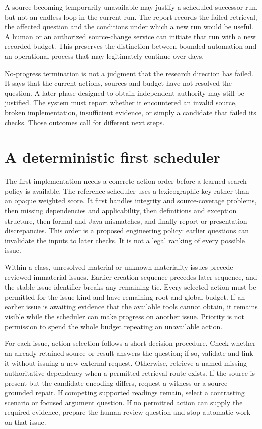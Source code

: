 \documentclass[12pt,a4paper,oneside,openany]{book}
\begin{document}
A source becoming temporarily unavailable may justify a scheduled successor run,
but not an endless loop in the current run. The report records the failed
retrieval, the affected question and the conditions under which a new run would
be useful. A human or an authorized source-change service can initiate that run
with a new recorded budget. This preserves the distinction between bounded
automation and an operational process that may legitimately continue over days.

No-progress termination is not a judgment that the research direction has failed.
It says that the current actions, sources and budget have not resolved the
question. A later phase designed to obtain independent authority may still be
justified. The system must report whether it encountered an invalid source,
broken implementation, insufficient evidence, or simply a candidate that failed
its checks. Those outcomes call for different next steps.

\section{A deterministic first scheduler}
\label{merge:M06:14}


The first implementation needs a concrete action order before a learned search
policy is available. The reference scheduler uses a lexicographic key rather
than an opaque weighted score. It first handles integrity and source-coverage
problems, then missing dependencies and applicability, then definitions and
exception structure, then formal and Java mismatches, and finally report or
presentation discrepancies. This order is a proposed engineering policy: earlier
questions can invalidate the inputs to later checks. It is not a legal ranking
of every possible issue.

Within a class, unresolved material or unknown-materiality issues precede reviewed
immaterial issues. Earlier creation sequence precedes later sequence, and the
stable issue identifier breaks any remaining tie. Every selected action must be
permitted for the issue kind and have remaining root and global budget. If an
earlier issue is awaiting evidence that the available tools cannot obtain, it
remains visible while the scheduler can make progress on another issue. Priority
is not permission to spend the whole budget repeating an unavailable action.

For each issue, action selection follows a short decision procedure. Check whether
an already retained source or result answers the question; if so, validate and
link it without issuing a new external request. Otherwise, retrieve a named
missing authoritative dependency when a permitted retrieval route exists. If the
source is present but the candidate encoding differs, request a witness or a
source-grounded repair. If competing supported readings remain, select a
contrasting scenario or focused argument question. If no permitted action can
supply the required evidence, prepare the human review question and stop automatic
work on that issue.
\end{document}
